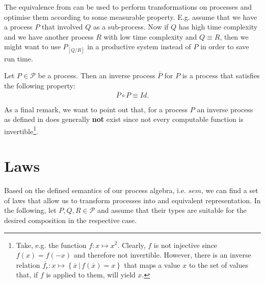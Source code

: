 The equivalence from  can be used to perform transformations on processes and optimise them according to some measurable property. E.g. assume that we have a process $P$ that involved $Q$ as a sub-process. Now if $Q$ has high time complexity and we have another process $R$ with low time complexity and $Q \equiv R$, then we might want to use $P_{\left[ Q / R \right]}$ in a productive system instead of $P$ in order to save run time.

\begin{definition}
\label{def:inverse_process}
Let $P \in \mathcal{P}$ be a process. Then an inverse process $\overline{P}$ for $P$ is a process that satisfies the following property:
  \begin{equation}
    \overline{P} \circ P \equiv Id.
  \end{equation}
  \hfill\qedsymbol
\end{definition}

As a final remark, we want to point out that, for a process $P$ an inverse process as defined in  does generally \textbf{not} exist since not every computable function is invertible\footnote{Take, e.g. the function $f \colon x \mapsto x^2$. Clearly, $f$ is not injective since $f \left( x \right) = f \left( -x \right)$ and therefore not invertible. However, there is an inverse relation $\overline{f_r} \colon x \mapsto \left\{ \overline{x} \,|\, f \left( \overline{x} \right) = x \right\}$ that maps a value $x$ to the set of values that, if $f$ is applied to them, will yield $x$.}.






\section{Laws}
\label{chp:laws}
Based on the defined semantics of our process algebra, i.e. $sem$, we can find a set of laws that allow us to transform processes into and equivalent representation. In the following, let $P, Q, R \in \mathcal{P}$ and assume that their types are suitable for the desired composition in the respective case.

